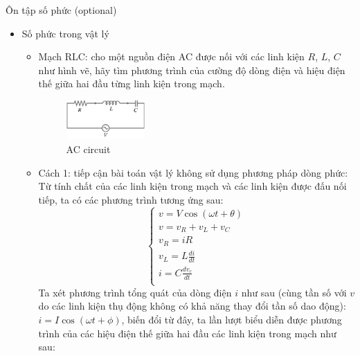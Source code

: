 \documentclass[8pt]{beamer}
\begin{document}
\begin{frame}{Ôn tập số phức (optional)}
\begin{itemize}
	\item Số phức trong vật lý
	\begin{itemize}
	\item Mạch RLC:
		cho một nguồn điện AC được nối với các linh kiện $R$, $L$, $C$ như hình vẽ, hãy tìm phương trình của cường độ dòng điện và hiệu điện thế giữa hai đầu từng linh kiện trong mạch. 
	\begin{figure}[h]
		\includegraphics[width=0.3\textwidth]{rlc.jpg}
		\caption{AC circuit}
		\label{fig:re7}
	\end{figure}
	\item Cách 1: tiếp cận bài toán vật lý không sử dụng phương pháp dòng phức:
\\ Từ tính chất của các linh kiện trong mạch và các linh kiện được đấu nối tiếp, ta có các phương trình tương ứng sau:
\begin{equation*}
\begin{cases}
	v=V\cos{(\omega t+\theta)} \\
	v=v_{R}+v_{L}+v_{C} \\
	v_{R}=iR \\
	v_{L}=L\frac{di}{dt} \\
	i=C\frac{dv_{c}}{dt} \\
\end{cases}
\end{equation*}
Ta xét phương trình tổng quát của dòng điện $i$ như sau (cùng tần số với $v$ do các linh kiện thụ động không có khả năng thay đổi tần số dao động): $i=I\cos(\omega t+\phi)$, biến đổi từ đây, ta lần lượt biểu diễn được phương trình của các hiệu điện thế giữa hai đầu các linh kiện trong mạch như sau:
\end{itemize}
\end{itemize}
\end{frame}
\end{document}
